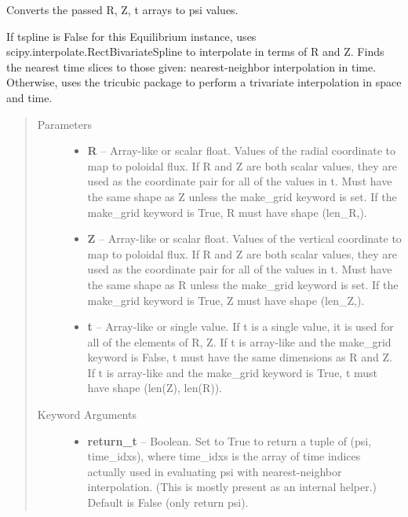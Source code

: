 \documentclass[letterpaper,10pt,english]{sphinxmanual}
\begin{document}
\begin{fulllineitems}
\begin{fulllineitems}
\begin{quote}
\begin{description}
\end{description}\end{quote}

\end{fulllineitems}


\begin{fulllineitems}
\label{eqtools:eqtools.core.Equilibrium.rz2psi}
Converts the passed R, Z, t arrays to psi values.

If tspline is False for this Equilibrium instance, uses
scipy.interpolate.RectBivariateSpline to interpolate in terms of R and
Z. Finds the nearest time slices to those given: nearest-neighbor
interpolation in time. Otherwise, uses the tricubic package to perform
a trivariate interpolation in space and time.
\begin{quote}\begin{description}
\item[{Parameters }] \leavevmode\begin{itemize}
\item {} 
\textbf{R} --
Array-like or scalar float. Values of the radial coordinate to
map to poloidal flux. If R and Z are both scalar values, they
are used as the coordinate pair for all of the values in t.
Must have the same shape as Z unless the make\_grid keyword is
set. If the make\_grid keyword is True, R must have shape (len\_R,).

\item {} 
\textbf{Z} --
Array-like or scalar float. Values of the vertical coordinate to
map to poloidal flux. If R and Z are both scalar values, they
are used as the coordinate pair for all of the values in t.
Must have the same shape as R unless the make\_grid keyword is
set. If the make\_grid keyword is True, Z must have shape (len\_Z,).

\item {} 
\textbf{t} --
Array-like or single value. If t is a single value, it is used
for all of the elements of R, Z. If t is array-like and the
make\_grid keyword is False, t must have the same dimensions as
R and Z. If t is array-like and the make\_grid keyword is True,
t must have shape (len(Z), len(R)).

\end{itemize}

\item[{Keyword Arguments}] \leavevmode\begin{itemize}
\item {} 
\textbf{return\_t} --
Boolean. Set to True to return a tuple of (psi, time\_idxs),
where time\_idxs is the array of time indices actually used in
evaluating psi with nearest-neighbor interpolation. (This is
mostly present as an internal helper.) Default is False (only
return psi).


\end{itemize}
\end{description}
\end{quote}
\end{fulllineitems}
\end{fulllineitems}
\end{document}
